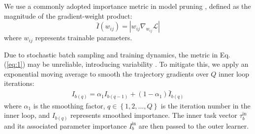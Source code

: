 We use a commonly adopted importance metric in model pruning \cite{konishi2023spg}, defined as the magnitude of the gradient-weight product:
\begin{equation}
\bar{I}\left(w_{i j}\right)=\left|w_{i j} \nabla_{w_{i j}} \mathcal{L}\right| \label{eq:1}
\end{equation}
where \(w_{ij}\) represents trainable parameters.  

Due to stochastic batch sampling and training dynamics, the metric in Eq. (\ref{eq:1}) may be unreliable, introducing variability \cite{zhang2022platon}. To mitigate this, we apply an exponential moving average \cite{zhang2023adalora} to smooth the trajectory gradients over $Q$ inner loop iterations:  
\begin{equation}
\begin{split}
I_{b(q)}   =\alpha_{1} I_{b(q-1)} + \left(1-\alpha_{1}\right) \bar{I}_{b(q)} \label{eq:I}
\end{split}
\end{equation}
where $\alpha_{1}$ is the smoothing factor, $q \in \left\{ 1, 2, ..., Q \right\}$ is the iteration number in the inner loop, and $I_{b(q)}$ represents smoothed importance.
The inner task vector \(\tau_b^{\text{in}}\) and its associated parameter importance \(I_b^{\text{in}}\) are then passed to the outer learner.



